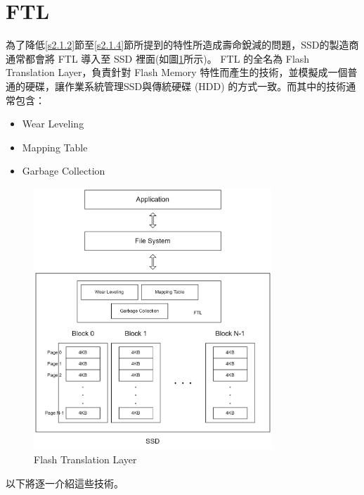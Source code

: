 \section{FTL}\label{s2.2}
\indent
為了降低\ref{s2.1.2}節至\ref{s2.1.4}節所提到的特性所造成壽命銳減的問題，SSD的製造商通常都會將 FTL 導入至 SSD 裡面(如圖\ref{f2.4}所示)。
FTL 的全名為 Flash Translation Layer，負責針對 Flash Memory 特性而產生的技術，並模擬成一個普通的硬碟，讓作業系統管理SSD與傳統硬碟 (HDD) 的方式一致。而其中的技術通常包含：\cite{Boukhobza2014ASA}
\begin{itemize}
    \item Wear Leveling
    \item Mapping Table
    \item Garbage Collection
\end{itemize}
\begin{figure}[H]
    \centering
    \includegraphics[width=0.8\textwidth]{picture/ch2/FTL.png}
    \caption{Flash Translation Layer}
    \label{f2.4}
\end{figure}
以下將逐一介紹這些技術。

